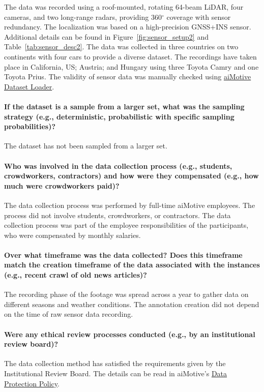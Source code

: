 \documentclass{article}
\begin{document}
The data was recorded using a roof-mounted, rotating 64-beam LiDAR, four cameras, and two long-range radars, providing 360$^{\circ}$ coverage with sensor redundancy. The localization was based on a high-precision GNSS+INS sensor. Additional details can be found in Figure~\ref{fig:sensor_setup2} and Table~\ref{tab:sensor_desc2}. The data was collected in three countries on two continents with four cars to provide a diverse dataset. The recordings have taken place in California, US; Austria; and Hungary using three Toyota Camry and one Toyota Prius. The validity of sensor data was manually checked using \href{https://github.com/aimotive/aimotive-dataset-loader}{aiMotive Dataset Loader}.

\paragraph{If the dataset is a sample from a larger set, what was the sampling strategy (e.g., deterministic, probabilistic with specific sampling probabilities)?} The dataset has not been sampled from a larger set.

\paragraph{Who was involved in the data collection process (e.g., students, crowdworkers, contractors) and how were they compensated (e.g., how much were crowdworkers paid)?} The data collection process was performed by full-time aiMotive employees. The process did not involve students, crowdworkers, or contractors. The data collection process was part of the employee responsibilities of the participants, who were compensated by monthly salaries.

\paragraph{Over what timeframe was the data collected? Does this timeframe match the creation timeframe of the data associated with the instances (e.g., recent crawl of old news articles)?} The recording phase of the footage was spread across a year to gather data on different seasons and weather conditions. The annotation creation did not depend on the time of raw sensor data recording.

\paragraph{Were any ethical review processes conducted (e.g., by an institutional review board)?} The data collection method has satisfied the requirements given by the Institutional Review Board. The details can be read in aiMotive's \href{https://aimotive.com/documents/d/guest/data-protection-policy-ai-development-5-august-2020-_en_hun_final}{Data Protection Policy}.
\end{document}
